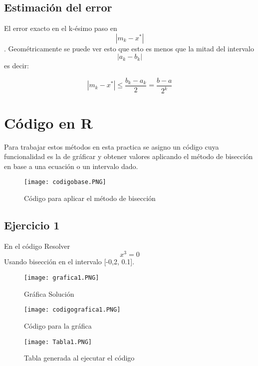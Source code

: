 \documentclass{article}
\begin{document}
\subsection{Estimación del error}
El error exacto en el k-ésimo paso en \[|m_{k} - x^{*}|\].
Geométricamente se puede ver esto que esto es menos que la mitad del intervalo \[|a_{k} - b_{k}|\] es decir:
\newline

\begin{equation}
    |m_{k} - x^{*}| \leq \frac{b_{k}-a_{k}}{2}= \frac{b-a}{2^{k}}
\end{equation}

\newpage
\section{Código en R}
Para trabajar estos métodos en esta practica se asigno un código cuya funcionalidad es la de gráficar y obtener valores aplicando el método de bisección en base a una ecuación o un intervalo dado.
\begin{figure}[h]
    \centering
    \texttt{[image: codigobase.PNG]}
    \caption{Código para aplicar el método de bisección}
    \label{fig:mesh2}
\end{figure}

\subsection{Ejercicio 1}
En el código Resolver 
\begin{equation}
    x^{3}= 0
\end{equation}
Usando bisección en el intervalo [-0,2, 0.1].
\newpage

\begin{figure}[h]
    \centering
    \texttt{[image: grafica1.PNG]}
    \caption{Gráfica Solución}
    \label{fig:mesh3}
\end{figure}

\begin{figure}[h]
    \centering
    \texttt{[image: codigografica1.PNG]}
    \caption{Código para la gráfica}
    \label{fig:mesh4}
\end{figure}

\newpage

\begin{figure}[h]
    \centering
    \texttt{[image: Tabla1.PNG]}
    \caption{Tabla generada al ejecutar el código}
    \label{fig:mesh5}
\end{figure}
\end{document}
